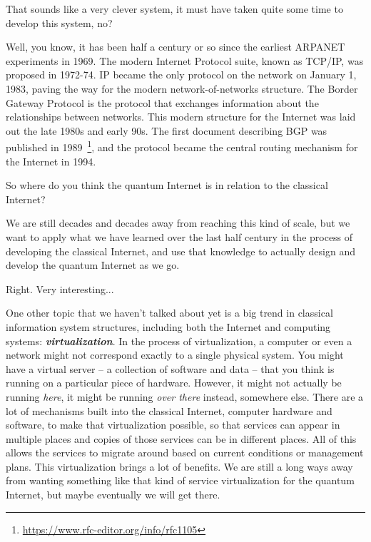 \mmm That sounds like a very clever system, it must have taken quite some time to develop this system, no?

\rrr Well, you know, it has been half a century or so since the earliest ARPANET experiments in 1969.  
The modern Internet Protocol suite, known as TCP/IP, was proposed in 1972-74. IP became the only protocol on the network on January 1, 1983, paving the way for the modern network-of-networks structure. 
The Border Gateway Protocol is the protocol that exchanges information about the relationships between networks. This modern structure for the Internet was laid out the late 1980s and early 90s. The first document describing BGP was published in 1989~\footnote{\url{https://www.rfc-editor.org/info/rfc1105}}, and the protocol became the central routing mechanism for the Internet in 1994.

\mmm So where do you think the quantum Internet is in relation to the classical Internet?

\rrr We are still decades and decades away from reaching this kind of scale, but we want to apply what we have learned over the last half century in the process of developing the classical Internet, and use that knowledge to actually design and develop the quantum Internet as we go.

\mmm Right. Very interesting...

\rrr One other topic that we haven't talked about yet is a big trend in classical information system structures, including both the Internet and computing systems: \textbf{\emph{virtualization}}. In the process of virtualization, a computer or even a network might not correspond exactly to a single physical system. You might have a virtual server -- a collection of software and data -- that you think is running on a particular piece of hardware.  However, it might not actually be running \emph{here}, it might be running \emph{over there} instead, somewhere else. There are a lot of mechanisms built into the classical Internet, computer hardware and software, to make that virtualization possible, so that services can appear in multiple places and copies of those services can be in different places. All of this allows the services to migrate around based on current conditions or management plans. This virtualization brings a lot of benefits. We are still a long ways away from wanting something like that kind of service virtualization for the quantum Internet, but maybe eventually we will get there.

